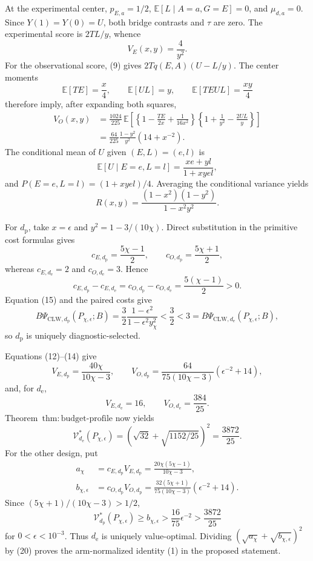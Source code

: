 At the experimental center, \(p_{E,a}=1/2\), \(\mathbb E[L\mid A=a,G=E]=0\), and \(\mu_{d,a}=0\). Since \(Y(1)=Y(0)=U\), both bridge contrasts and \(\tau\) are zero. The experimental score is \(2TL/y\), whence
\[
 V_E(x,y)=\frac4{y^2}.                                  \tag{12}
\]
For the observational score, (9) gives \(2Tq(E,A)(U-L/y)\). The center moments
\[
 \mathbb E[TE]=\frac{x}{4},\qquad
 \mathbb E[UL]=y,
 \qquad
 \mathbb E[TEUL]=\frac{xy}{4}                           \tag{13}
\]
therefore imply, after expanding both squares,
\[
\begin{aligned}
 V_O(x,y)
 &=\frac{1024}{225}\,
 \mathbb E\!\left[
 \left\{1-\frac{TE}{2x}+\frac1{16x^2}\right\}
 \left\{1+\frac1{y^2}-\frac{2UL}{y}\right\}
 \right]\\
 &=\frac{64}{225}\frac{1-y^2}{y^2}\left(14+x^{-2}\right). \tag{14}
\end{aligned}
\]
The conditional mean of \(U\) given \((E,L)=(e,l)\) is
\[
 \mathbb E[U\mid E=e,L=l]=\frac{xe+yl}{1+xyel},
\]
and \(P(E=e,L=l)=(1+xyel)/4\). Averaging the conditional variance yields
\[
 R(x,y)=\frac{(1-x^2)(1-y^2)}{1-x^2y^2}.               \tag{15}
\]

For \(d_{\mathrm p}\), take \(x=\epsilon\) and \(y^2=1-3/(10\chi)\). Direct substitution in the primitive cost formulas gives
\[
 c_{E,d_{\mathrm p}}=\frac{5\chi-1}{2},\qquad
 c_{O,d_{\mathrm p}}=\frac{5\chi+1}{2},
\]
whereas \(c_{E,d_{\mathrm e}}=2\) and \(c_{O,d_{\mathrm e}}=3\). Hence
\[
 c_{E,d_{\mathrm p}}-c_{E,d_{\mathrm e}}
 =c_{O,d_{\mathrm p}}-c_{O,d_{\mathrm e}}
 =\frac{5(\chi-1)}2>0.                                 \tag{16}
\]
Equation (15) and the paired costs give
\[
 B\Psi_{\mathrm{CLW},d_{\mathrm p}}(P_{\chi,\epsilon};B)
 =\frac32\frac{1-\epsilon^2}{1-\epsilon^2y_\chi^2}
 <\frac32<3
 =B\Psi_{\mathrm{CLW},d_{\mathrm e}}(P_{\chi,\epsilon};B), \tag{17}
\]
so \(d_{\mathrm p}\) is uniquely diagnostic-selected.

Equations (12)--(14) give
\[
 V_{E,d_{\mathrm p}}=\frac{40\chi}{10\chi-3},
 \qquad
 V_{O,d_{\mathrm p}}
 =\frac{64}{75(10\chi-3)}(\epsilon^{-2}+14),           \tag{18}
\]
and, for \(d_{\mathrm e}\),
\[
 V_{E,d_{\mathrm e}}=16,\qquad
 V_{O,d_{\mathrm e}}=\frac{384}{25}.                   \tag{19}
\]
Theorem~\(\mathrm{thm{:}budget\text{-}profile}\) now yields
\[
 \mathcal V_{d_{\mathrm e}}^*(P_{\chi,\epsilon})
 =\left(\sqrt{32}+\sqrt{1152/25}\right)^2
 =\frac{3872}{25}.                                     \tag{20}
\]
For the other design, put
\[
\begin{aligned}
 a_\chi
 &=c_{E,d_{\mathrm p}}V_{E,d_{\mathrm p}}
 =\frac{20\chi(5\chi-1)}{10\chi-3},\\
 b_{\chi,\epsilon}
 &=c_{O,d_{\mathrm p}}V_{O,d_{\mathrm p}}
 =\frac{32(5\chi+1)}{75(10\chi-3)}
   (\epsilon^{-2}+14).                                  \tag{21}
\end{aligned}
\]
Since \((5\chi+1)/(10\chi-3)>1/2\),
\[
 \mathcal V_{d_{\mathrm p}}^*(P_{\chi,\epsilon})
 \ge b_{\chi,\epsilon}
 >\frac{16}{75}\epsilon^{-2}
 >\frac{3872}{25}                                      \tag{22}
\]
for \(0<\epsilon<10^{-3}\). Thus \(d_{\mathrm e}\) is uniquely value-optimal. Dividing \((\sqrt{a_\chi}+\sqrt{b_{\chi,\epsilon}})^2\) by (20) proves the arm-normalized identity (1) in the proposed statement.

